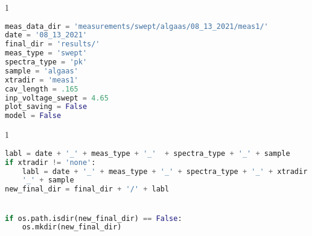 \begin{spacing}{1} \begin{lstlisting}[frame=single, language=Python]
meas_data_dir = 'measurements/swept/algaas/08_13_2021/meas1/'                                # directory where the uncalibrated data lives
date = '08_13_2021'                                                              # date when measurement was taken ("mm_dd_yyyy")
final_dir = 'results/'                                                           # directory where the final data will live
meas_type = 'swept'                                                              # type of measurement taken tag (i.e. noise, swept)
spectra_type = 'pk'                                                              # spectra type (i.e. pk, rms)
sample = 'algaas'                                                                # sample tag (i.e. algaas, atfilms, sio2tao5, etc.)
xtradir = 'meas1'                                                                # this label helps distinguish between measurements taken in a given day
cav_length = .165                                                                # recorded length of cavity
inp_voltage_swept = 4.65                                                         # voltage sent from SR785 to HVA connected to electrodes
plot_saving = False                                                              # generate and save .png files for intermediate calibration functions
model = False                                                                    # boolean that decides whether or not the model estimate should be plotted with calibrated data
\end{lstlisting} \end{spacing}

\begin{spacing}{1} \begin{lstlisting}[frame=single, language=Python]
labl = date + '_' + meas_type + '_'  + spectra_type + '_' + sample               # label of the directory containing all the figures and .h5 file
if xtradir != 'none':                                                            # adjusted label if an extra directory was used
    labl = date + '_' + meas_type + '_' + spectra_type + '_' + xtradir +  \
    '_' + sample
new_final_dir = final_dir + '/' + labl


if os.path.isdir(new_final_dir) == False:                                        # generates the directory containing the results if it doesn't already exist
    os.mkdir(new_final_dir)
\end{lstlisting} \end{spacing}

